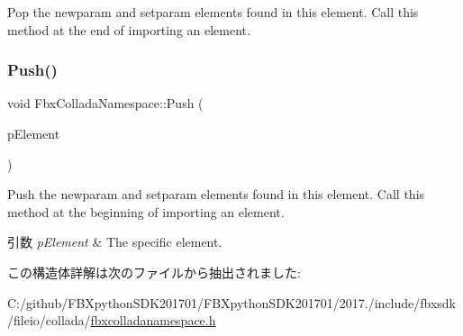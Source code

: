 Pop the newparam and setparam elements found in this element. Call this method at the end of importing an element. \mbox{\label{struct_fbx_collada_namespace_a844aeced65709b23349ed14e444c862b}} 
\subsubsection{\texorpdfstring{Push()}{Push()}}
{\footnotesize\ttfamily void Fbx\+Collada\+Namespace\+::\+Push (\begin{DoxyParamCaption}\item[{xml\+Node $\ast$}]{p\+Element }\end{DoxyParamCaption})}

Push the newparam and setparam elements found in this element. Call this method at the beginning of importing an element. 
\begin{DoxyParams}{引数}
{\em p\+Element} & The specific element. \\
\hline
\end{DoxyParams}


この構造体詳解は次のファイルから抽出されました\+:\begin{DoxyCompactItemize}
\item 
C\+:/github/\+F\+B\+Xpython\+S\+D\+K201701/\+F\+B\+Xpython\+S\+D\+K201701/2017./include/fbxsdk/fileio/collada/\hyperlink{fbxcolladanamespace_8h}{fbxcolladanamespace.\+h}\end{DoxyCompactItemize}
